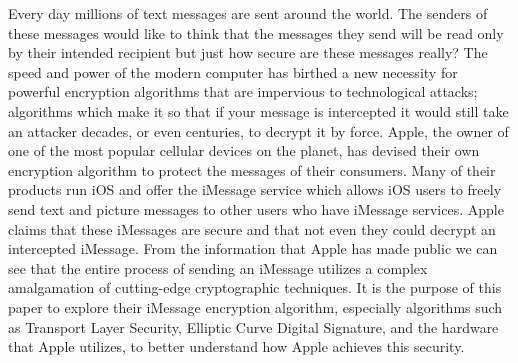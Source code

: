 Every day millions of text messages are sent around the world.  The senders of
these messages would like to think that the messages they send will be read
only by their intended recipient but just how secure are these messages really?
The speed and power of the modern computer has birthed a new necessity for
powerful encryption algorithms that are impervious to technological attacks;
algorithms which make it so that if your message is intercepted it would still
take an attacker decades, or even centuries, to decrypt it by force.  Apple,
the owner of one of the most popular cellular devices on the planet, has
devised their own encryption algorithm to protect the messages of their
consumers.  Many of their products run iOS and offer the iMessage service which
allows iOS users to freely send text and picture messages to other users who
have iMessage services.  Apple claims that these iMessages are secure and that
not even they could decrypt an intercepted iMessage.  From the information that
Apple has made public we can see that the entire process of sending an iMessage
utilizes a complex amalgamation of cutting-edge cryptographic techniques.  It
is the purpose of this paper to explore their iMessage encryption algorithm,
especially algorithms such as Transport Layer Security, Elliptic Curve Digital
Signature, and the hardware that Apple utilizes, to better understand how Apple
achieves this security.
